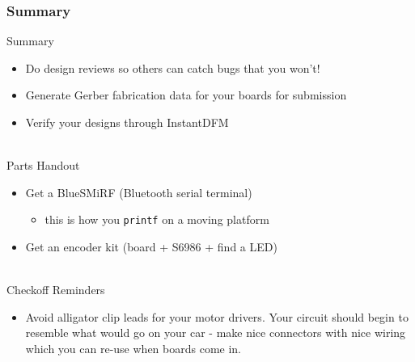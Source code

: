 \documentclass{beamer}
\begin{document}
\begin{frame}
\frametitle{Summary}
Summary
\begin{itemize}
  \item Do design reviews so others can catch bugs that you won't!
  \item Generate Gerber fabrication data for your boards for submission
  \item Verify your designs through InstantDFM
\end{itemize}

\hfill \\
Parts Handout
\begin{itemize}
  \item Get a BlueSMiRF (Bluetooth serial terminal)
  \begin{itemize}
    \item this is how you \texttt{printf} on a moving platform
  \end{itemize}
  \item Get an encoder kit (board + S6986 + find a LED)
\end{itemize}

\hfill \\
Checkoff Reminders
\begin{itemize}
  \item Avoid alligator clip leads for your motor drivers. Your circuit should begin to resemble what would go on your car - make nice connectors with nice wiring which you can re-use when boards come in.
\end{itemize}
\end{frame}
\end{document}

